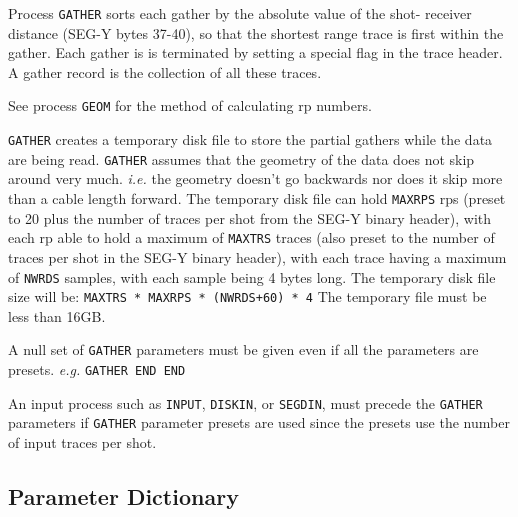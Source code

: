 Process \texttt{GATHER} sorts each \gls{gather} by the absolute value of the shot-
receiver distance (SEG-Y bytes 37-40), so that the shortest range trace
is first within the \gls{gather}.  Each \gls{gather} is is terminated by setting a
special flag in the trace header.  A \gls{gather} record is the collection of
all these traces.

See process \texttt{GEOM} for the method of calculating \gls{rp} numbers.

\texttt{GATHER} creates a temporary disk file to store the partial \glspl{gather} while
the data are being read.  \texttt{GATHER} assumes that the geometry of the data
does not skip around very much. \textit{i.e.} the geometry doesn't go backwards
nor does it skip more than a cable length forward.  The temporary disk
file can hold \texttt{MAXRPS} \glspl{rp} (preset to 20 plus the number of traces per \gls{shot}
from the SEG-Y binary header), with each \gls{rp} able to hold a maximum of
\texttt{MAXTRS} traces (also preset to the number of traces per \gls{shot} in the SEG-Y
binary header), with each trace having a maximum of \texttt{NWRDS} samples, with each
sample being 4 bytes long.  The temporary disk file size will be:
   \texttt{MAXTRS * MAXRPS * (NWRDS+60) * 4}
The temporary file must be less than 16GB.

A null set of \texttt{GATHER} parameters must be given even if all the parameters
are presets.    \textit{e.g.}  \texttt{GATHER END END}

An input process such as \texttt{INPUT}, \texttt{DISKIN}, or \texttt{SEGDIN}, must precede the
\texttt{GATHER} parameters if \texttt{GATHER} parameter presets are used since the
presets use the number of input traces per \gls{shot}.

\subsection{Parameter Dictionary}

